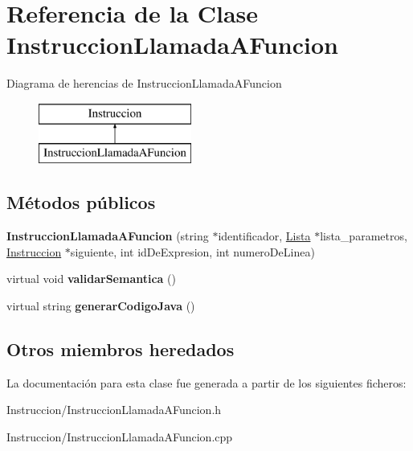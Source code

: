 \hypertarget{class_instruccion_llamada_a_funcion}{\section{Referencia de la Clase Instruccion\-Llamada\-A\-Funcion}
\label{class_instruccion_llamada_a_funcion}
}
Diagrama de herencias de Instruccion\-Llamada\-A\-Funcion\begin{figure}[H]
\begin{center}
\leavevmode
\includegraphics[height=2.000000cm]{class_instruccion_llamada_a_funcion}
\end{center}
\end{figure}
\subsection*{Métodos públicos}
\begin{DoxyCompactItemize}
\item 
\hypertarget{class_instruccion_llamada_a_funcion_abb47808f1a3ae5d218e3f02b899032f8}{{\bfseries Instruccion\-Llamada\-A\-Funcion} (string $\ast$identificador, \hyperlink{class_lista}{Lista} $\ast$lista\-\_\-parametros, \hyperlink{class_instruccion}{Instruccion} $\ast$siguiente, int id\-De\-Expresion, int numero\-De\-Linea)}\label{class_instruccion_llamada_a_funcion_abb47808f1a3ae5d218e3f02b899032f8}

\item 
\hypertarget{class_instruccion_llamada_a_funcion_a8d10eb990d87092020c7b7cb3f7961a1}{virtual void {\bfseries validar\-Semantica} ()}\label{class_instruccion_llamada_a_funcion_a8d10eb990d87092020c7b7cb3f7961a1}

\item 
\hypertarget{class_instruccion_llamada_a_funcion_aa48f82d3daf3d97c2e9a855609df7ac7}{virtual string {\bfseries generar\-Codigo\-Java} ()}\label{class_instruccion_llamada_a_funcion_aa48f82d3daf3d97c2e9a855609df7ac7}

\end{DoxyCompactItemize}
\subsection*{Otros miembros heredados}


La documentación para esta clase fue generada a partir de los siguientes ficheros\-:\begin{DoxyCompactItemize}
\item 
Instruccion/Instruccion\-Llamada\-A\-Funcion.\-h\item 
Instruccion/Instruccion\-Llamada\-A\-Funcion.\-cpp\end{DoxyCompactItemize}
